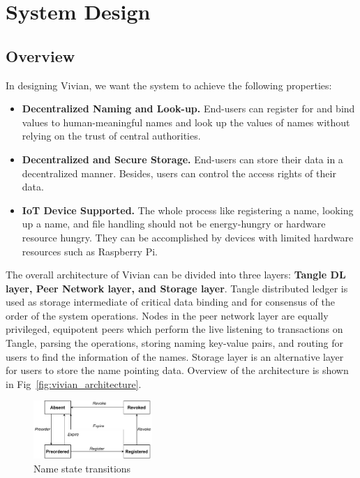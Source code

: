 \section{System Design}
\label{sec:design}

\subsection{Overview}
In designing Vivian, we want the system to achieve the following properties:

\begin{itemize}
    \item \textbf{Decentralized Naming and Look-up.} End-users can register for and bind values to human-meaningful names and look up the values of names without relying on the trust of central authorities.
    \item \textbf{Decentralized and Secure Storage.} End-users can store their data in a decentralized manner. Besides, users can control the access rights of their data.
    \item  \textbf{IoT Device Supported.} The whole process like registering a name, looking up a name, and file handling should not be energy-hungry or hardware resource hungry.
          They can be accomplished by devices with limited hardware resources such as Raspberry Pi.
\end{itemize}

The overall architecture of Vivian can be divided into three layers: \textbf{Tangle DL layer, Peer Network layer, and Storage layer}.
Tangle distributed ledger is used as storage intermediate of critical data binding and for consensus of the order of the system operations.
Nodes in the peer network layer are equally privileged, equipotent peers which perform the live listening to transactions on Tangle, parsing the operations, storing naming key-value pairs, and routing for users to find the information of the names.
Storage layer is an alternative layer for users to store the name pointing data. Overview of the architecture is shown in Fig~\ref{fig:vivian_architecture}.

\begin{figure}[h]
    \centering
    \includegraphics[width=0.4\textwidth,trim={0 0 0 0},clip]{figs/name_state_transition.pdf}
    \caption{Name state transitions}
    \label{fig:name_state_transition}
\end{figure}

